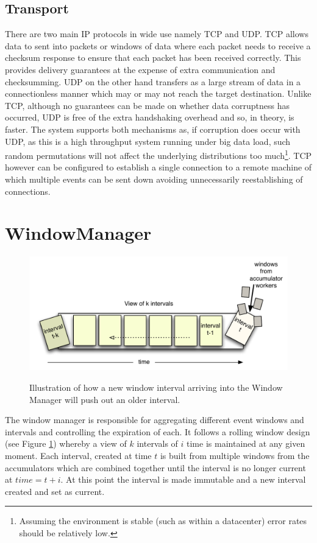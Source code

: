 \documentclass[a4paper,11pt]{scrreprt}
\begin{document}
\subsection{Transport}
There are two main IP protocols in wide use namely TCP and UDP. TCP allows data to sent into packets or windows of data where each packet needs to receive a checksum response to ensure that each packet has been received correctly. This provides delivery guarantees at the expense of extra communication and checksumming. UDP on the other hand transfers as a large stream of data in a connectionless manner which may or may not reach the target destination. Unlike TCP, although no guarantees can be made on whether data corruptness has occurred, UDP is free of the extra handshaking overhead and so, in theory, is faster. The system supports both mechanisms as, if corruption does occur with UDP, as this is a high throughput system running under big data load, such random permutations will not affect the underlying distributions too much\footnote{Assuming the environment is stable (such as within a datacenter) error rates should be relatively low.}. TCP however can be configured to establish a single connection to a remote machine of which multiple events can be sent down avoiding unnecessarily reestablishing of connections.
\section{WindowManager}
\begin{figure}[h!]
\centering
\caption{Illustration of how a new window interval arriving into the Window Manager will push out an older interval.}
\includegraphics[scale=0.72, trim=0 0 0 12, clip=true] {window.pdf}
\label{fig:rollingwindow}
\end{figure}
The window manager is responsible for aggregating different event windows and intervals and controlling the expiration of each. It follows a rolling window design (see Figure \ref{fig:rollingwindow}) whereby a view of \(k\) intervals of \(i\) time is maintained at any given moment. Each interval, created at time \(t\) is built from multiple windows from the accumulators which are combined together until the interval is no longer current at \(time = t+i\). At this point the interval is made immutable and a new interval created and set as current. 
\end{document}
